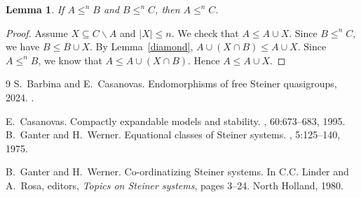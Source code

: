 \documentclass[10pt,a4paper]{article}
\theoremstyle{note}
\newtheorem{lemma}[thm]{Lemma}
\begin{document}
\begin{lemma}\label{sat3}  If  $A\leq^n B$ and $B\leq^n C$, then $A\leq^n C$.
\end{lemma}

\begin{proof}  Assume $X\subseteq C \smallsetminus A$  and $|X|\leq n$. We check that  $A\leq A\cup X$. Since $B\leq^n C$, we have $B\leq B\cup X$. By Lemma~\ref{diamond},   $A\cup (X\cap B)\leq A\cup X$.
	Since $A\leq^n B$, we know that $A\leq A\cup (X\cap B)$.  Hence  $A\leq A\cup X$.
\end{proof}

\begin{thebibliography}{9}
S.~Barbina and E.~Casanovas.
\newblock Endomorphisms of free {S}teiner quasigroups, 2024.
.

E.~Casanovas.
\newblock Compactly expandable models and stability.
, 60:673--683, 1995.
B.~Ganter and H.~Werner.
\newblock Equational classes of {S}teiner systems.
, 5:125--140, 1975.

B.~Ganter and H.~Werner.
\newblock Co-ordinatizing {S}teiner systems.
\newblock In C.C. Linder and A.~Rosa, editors, {\em Topics on {S}teiner
  systems}, pages 3--24. North Holland, 1980.
\end{thebibliography}
\end{document}
